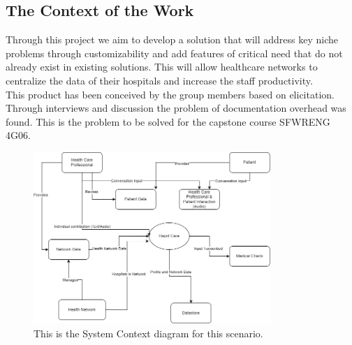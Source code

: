 \documentclass[12pt]{article}
\begin{document}
\subsection{The Context of the Work}

Through this project we aim to develop a solution that will address key niche problems through customizability and add features of critical need that do not already exist in existing solutions. This will allow healthcare networks to centralize the data of their hospitals and increase the staff productivity.\\

\noindent This product has been conceived by the group members based on elicitation. Through interviews and discussion the problem of documentation overhead was found. This is the problem to be solved for the capstone course SFWRENG 4G06.

\begin{figure}[H]
  \includegraphics[width=0.8\textwidth]{System_Context.png}
  \caption{This is the System Context diagram for this scenario.}
\end{figure}
\end{document}
